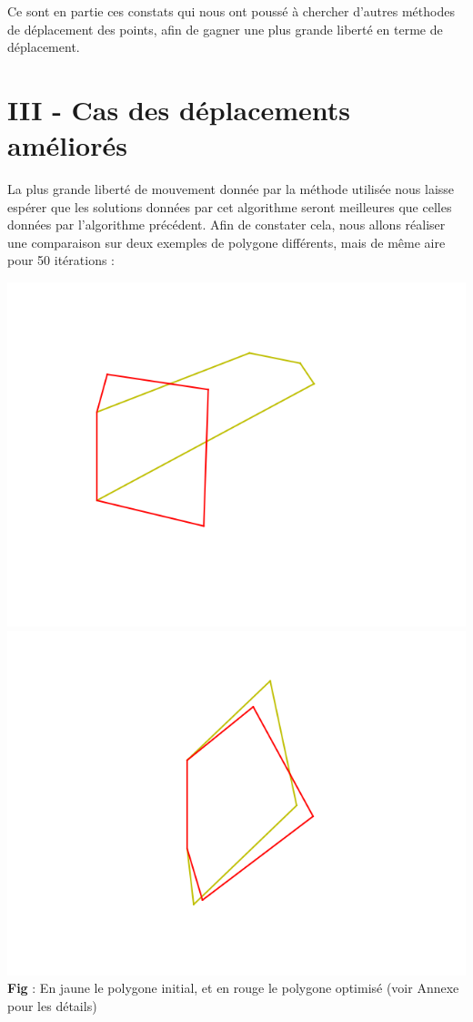 \documentclass[a4paper,reqno]{article}
\newcommand{\pa}{\hspace{1cm}}
\begin{document}
\par Ce sont en partie ces constats qui nous ont poussé à chercher d'autres méthodes de déplacement des points, afin de gagner une plus grande liberté en terme de déplacement.\\
\newpage 

\section*{III - Cas des déplacements améliorés}

\pa La plus grande liberté de mouvement donnée par la méthode utilisée nous laisse espérer que les solutions données par cet algorithme seront meilleures que celles données par l'algorithme précédent. Afin de constater cela, nous allons réaliser une comparaison sur deux exemples de polygone différents, mais de même aire pour 50 itérations :  \\

\begin{center}

	\includegraphics[scale=0.45]{resultat_souple_2.png}
	\includegraphics[scale=0.45]{resultat_souple_4.png}\\
	\textbf{Fig} : En jaune le polygone initial, et en rouge le polygone optimisé (voir Annexe pour les détails)
\end{center}
\end{document}
